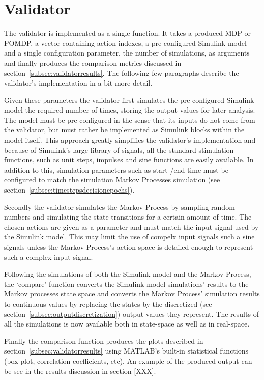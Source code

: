 \section{Validator}

The validator is implemented as a single function. It takes a produced MDP or POMDP, a vector containing action indexes, a pre-configured Simulink model and a single configuration parameter, the number of simulations, as arguments and finally produces the comparison metrics discussed in section~\ref{subsec:validatorresults}. The following few paragraphs describe the validator's implementation in a bit more detail.

Given these parameters the validator first simulates the pre-configured Simulink model the required number of times, storing the output values for later analysis. The model must be pre-configured in the sense that its inputs do not come from the validator, but must rather be implemented as Simulink blocks within the model itself. This approach greatly simplifies the validator's implementation and because of Simulink's large library of signals, all the standard stimulation functions, such as unit steps, impulses and sine functions are easily available. In addition to this, simulation parameters such as start-/end-time must be configured to match the simulation Markov Processes simulation (see section~\ref{subsec:timestepsdecisionepochs}).

Secondly the validator simulates the Markov Process by sampling random numbers and simulating the state transitions for a certain amount of time. The chosen actions are given as a parameter and must match the input signal used by the Simulink model. This may limit the use of compelx input signals such a sine signals unless the Markov Process's action space is detailed enough to represent such a complex input signal.

Following the simulations of both the Simulink model and the Markov Process, the `compare' function converts the Simulink model simulations' results to the Markov processes state space and converts the Markov Process' simulation results to continuous values by replacing the states by the discretized (see section~\ref{subsec:outputdiscretization}) output values they represent. The results of all the simulations is now available both in state-space as well as in real-space.

Finally the comparison function produces the plots described in section~\ref{subsec:validatorresults} using MATLAB's built-in statistical functions (box plot, correlation coefficients, etc). An example of the produced output can be see in the results discussion in section [XXX].